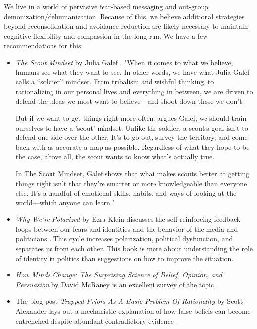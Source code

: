 \documentclass[12pt,letterpaper]{book}
\begin{document}
We live in a world of pervasive fear-based messaging and out-group demonization/dehumanization. Because of this, we believe additional strategies beyond reconsolidation and avoidance-reduction are likely necessary to maintain cognitive flexibility and compassion in the long-run. We have a few recommendations for this:
\begin{itemize}
    \item \textit{The Scout Mindset} by Julia Galef \cite{galefScoutMindset}. "When it comes to what we believe, humans see what they want to see. In other words, we have what Julia Galef calls a “soldier” mindset. From tribalism and wishful thinking, to rationalizing in our personal lives and everything in between, we are driven to defend the ideas we most want to believe—and shoot down those we don't.

    But if we want to get things right more often, argues Galef, we should train ourselves to have a 'scout' mindset. Unlike the soldier, a scout's goal isn't to defend one side over the other. It's to go out, survey the territory, and come back with as accurate a map as possible. Regardless of what they hope to be the case, above all, the scout wants to know what's actually true.
    
    In The Scout Mindset, Galef shows that what makes scouts better at getting things right isn't that they're smarter or more knowledgeable than everyone else. It's a handful of emotional skills, habits, and ways of looking at the world—which anyone can learn."
    \item \textit{Why We're Polarized} by Ezra Klein discusses the self-reinforcing feedback loops between our fears and identities and the behavior of the media and politicians \cite{klein2020Polarized}. This cycle increases polarization, political dysfunction, and separates us from each other. This book is more about understanding the role of identity in politics than suggestions on how to improve the situation.
    \item \textit{How Minds Change: The Surprising Science of Belief, Opinion, and Persuasion} by David McRaney is an excellent survey of the topic \cite{mcraneyMinds}.
    \item The blog post \textit{Trapped Priors As A Basic Problem Of Rationality} by Scott Alexander lays out a mechanistic explanation of how false beliefs can become entrenched despite abundant contradictory evidence \cite{alexanderTrapped}.
\end{itemize}
\label{sec:glossary}
\printglossaries
{}
\appendix
\end{document}
